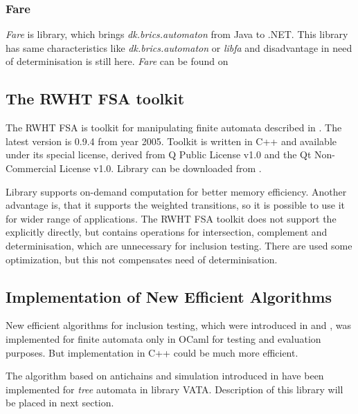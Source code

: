 \subsubsection{Fare}
\emph{Fare} is library, which brings \emph{dk.brics.automaton} from Java to .NET. 
This library has same characteristics like \emph{dk.brics.automaton} or \emph{libfa} and disadvantage in need of determinisation is still here. 
\emph{Fare} can be found on \cite{fare}

\subsection{The RWHT FSA toolkit}
The RWHT FSA is toolkit for manipulating finite automata described in \cite{kanthakN04}. The latest version is 0.9.4 from year 2005. Toolkit is written in C++
and available under its special license, derived from Q Public License v1.0 and the Qt Non-Commercial License v1.0. Library can be downloaded from \cite{rwth}. 

Library supports on-demand computation for better memory efficiency. Another advantage is, that it supports the weighted transitions, so it is possible to use it
for wider range of applications. The RWHT FSA toolkit does not support the explicitly directly, but contains operations for intersection, complement and
determinisation, which are unnecessary for inclusion testing. There are used some optimization, but this not compensates need of 
determinisation. 

\subsection{Implementation of New Efficient Algorithms}
New efficient algorithms for inclusion testing, which were introduced in \cite{cav06,tacas10} and \cite{popl13}, was implemented for finite automata 
only in OCaml for testing and evaluation purposes. But implementation in C++ could be much more efficient.

The algorithm based on antichains and simulation introduced in \cite{taca10} have been implemented for \emph{tree} automata in library VATA. Description
of this library will be placed in next section.

